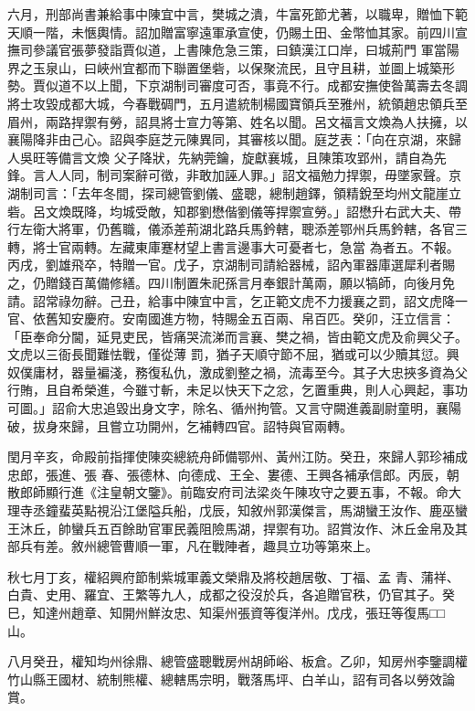 \begin{pinyinscope}
 六月，刑部尚書兼給事中陳宜中言，樊城之潰，牛富死節尤著，以職卑，贈恤下範天順一階，未愜輿情。詔加贈富寧遠軍承宣使，仍賜土田、金幣恤其家。前四川宣撫司參議官張夢發詣賈似道，上書陳危急三策，曰鎮漢江口岸，曰城荊門
 軍當陽界之玉泉山，曰峽州宜都而下聯置堡砦，以保聚流民，且守且耕，並圖上城築形勢。賈似道不以上聞，下京湖制司審度可否，事竟不行。成都安撫使昝萬壽去冬調將士攻毀成都大城，今春戰碉門，五月遣統制楊國寶領兵至雅州，統領趙忠領兵至眉州，兩路捍禦有勞，詔具將士宣力等第、姓名以聞。呂文福言文煥為人扶擁，以襄陽降非由己心。詔與李庭芝元陳異同，其審核以聞。庭芝表：「向在京湖，來歸人吳旺等備言文煥
 父子降狀，先納莞鑰，旋獻襄城，且陳策攻郢州，請自為先鋒。言人人同，制司案辭可徵，非敢加誣人罪。」詔文福勉力捍禦，毋墜家聲。京湖制司言：「去年冬間，探司總管劉儀、盛聰，總制趙鐸，領精銳至均州文龍崖立砦。呂文煥既降，均城受敵，知郡劉懋偕劉儀等捍禦宣勞。」詔懋升右武大夫、帶行左衛大將軍，仍舊職，儀添差荊湖北路兵馬鈐轄，聰添差鄂州兵馬鈐轄，各官三轉，將士官兩轉。左藏東庫蹇材望上書言邊事大可憂者七，急當
 為者五。不報。丙戌，劉雄飛卒，特贈一官。戊子，京湖制司請給器械，詔內軍器庫選犀利者賜之，仍贈錢百萬備修繕。四川制置朱祀孫言月奉銀計萬兩，願以犒師，向後月免請。詔常祿勿辭。己丑，給事中陳宜中言，乞正範文虎不力援襄之罰，詔文虎降一官、依舊知安慶府。安南國進方物，特賜金五百兩、帛百匹。癸卯，汪立信言：「臣奉命分閫，延見吏民，皆痛哭流涕而言襄、樊之禍，皆由範文虎及俞興父子。文虎以三衙長聞難怯戰，僅從薄
 罰，猶子天順守節不屈，猶或可以少贖其愆。興奴僕庸材，器量褊淺，務復私仇，激成劉整之禍，流毒至今。其子大忠挾多資為父行賄，且自希榮進，今雖寸斬，未足以快天下之忿，乞置重典，則人心興起，事功可圖。」詔俞大忠追毀出身文字，除名、循州拘管。又言守闕進義副尉童明，襄陽破，拔身來歸，且嘗立功開州，乞補轉四官。詔特與官兩轉。



 閏月辛亥，命殿前指揮使陳奕總統舟師備鄂州、黃州江防。癸丑，來歸人郭珍補成忠郎，張進、張
 春、張德林、向德成、王全、婁德、王興各補承信郎。丙辰，朝散郎師顯行進《注皇朝文鑒》。前臨安府司法梁炎午陳攻守之要五事，不報。命大理寺丞鐘蜚英點視沿江堡隘兵船，戊辰，知敘州郭漢傑言，馬湖蠻王汝作、鹿巫蠻王沐丘，帥蠻兵五百餘助官軍民義阻險馬湖，捍禦有功。詔賞汝作、沐丘金帛及其部兵有差。敘州總管曹順一軍，凡在戰陣者，趣具立功等第來上。



 秋七月丁亥，權紹興府節制紫城軍義文榮鼎及將校趙居敬、丁福、孟
 青、蒲祥、白貴、史用、羅宜、王繁等九人，成都之役沒於兵，各追贈官秩，仍官其子。癸巳，知達州趙章、知開州鮮汝忠、知渠州張資等復洋州。戊戌，張玨等復馬□□山。



 八月癸丑，權知均州徐鼎、總管盛聰戰房州胡師峪、板倉。乙卯，知房州李鑒調權竹山縣王國材、統制熊權、總轄馬宗明，戰落馬坪、白羊山，詔有司各以勞效論賞。




\end{pinyinscope}
